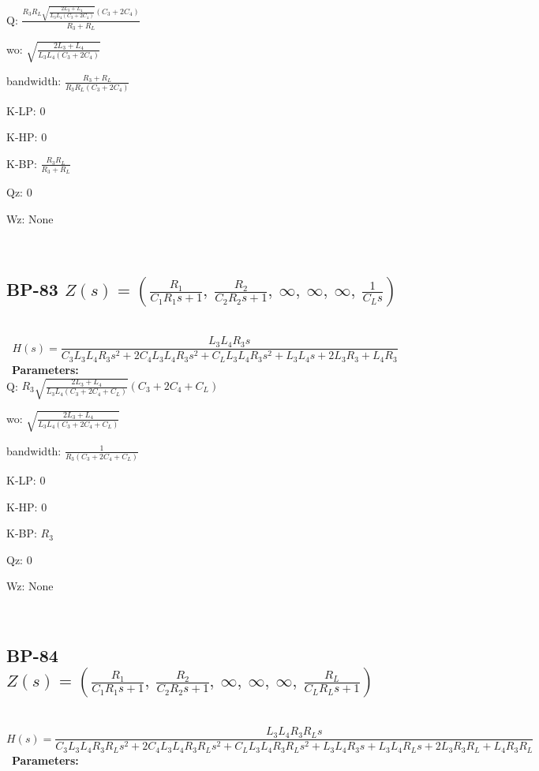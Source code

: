 \documentclass{article}
\begin{document}
Q: $\frac{R_{3} R_{L} \sqrt{\frac{2 L_{3} + L_{4}}{L_{3} L_{4} \left(C_{3} + 2 C_{4}\right)}} \left(C_{3} + 2 C_{4}\right)}{R_{3} + R_{L}}$\ 

wo: $\sqrt{\frac{2 L_{3} + L_{4}}{L_{3} L_{4} \left(C_{3} + 2 C_{4}\right)}}$\ 

bandwidth: $\frac{R_{3} + R_{L}}{R_{3} R_{L} \left(C_{3} + 2 C_{4}\right)}$\ 

K-LP: $0$\ 

K-HP: $0$\ 

K-BP: $\frac{R_{3} R_{L}}{R_{3} + R_{L}}$\ 

Qz: $0$\ 

Wz: $\text{None}$\ 

\ 

\subsection{BP-83 $Z(s) = \left( \frac{R_{1}}{C_{1} R_{1} s + 1}, \  \frac{R_{2}}{C_{2} R_{2} s + 1}, \  \infty, \  \infty, \  \infty, \  \frac{1}{C_{L} s}\right)$ } \ 
\textbf{\[H(s) = \frac{L_{3} L_{4} R_{3} s}{C_{3} L_{3} L_{4} R_{3} s^{2} + 2 C_{4} L_{3} L_{4} R_{3} s^{2} + C_{L} L_{3} L_{4} R_{3} s^{2} + L_{3} L_{4} s + 2 L_{3} R_{3} + L_{4} R_{3}}\] } \ 
\textbf{Parameters:}\\ 

Q: $R_{3} \sqrt{\frac{2 L_{3} + L_{4}}{L_{3} L_{4} \left(C_{3} + 2 C_{4} + C_{L}\right)}} \left(C_{3} + 2 C_{4} + C_{L}\right)$\ 

wo: $\sqrt{\frac{2 L_{3} + L_{4}}{L_{3} L_{4} \left(C_{3} + 2 C_{4} + C_{L}\right)}}$\ 

bandwidth: $\frac{1}{R_{3} \left(C_{3} + 2 C_{4} + C_{L}\right)}$\ 

K-LP: $0$\ 

K-HP: $0$\ 

K-BP: $R_{3}$\ 

Qz: $0$\ 

Wz: $\text{None}$\ 

\ 

\subsection{BP-84 $Z(s) = \left( \frac{R_{1}}{C_{1} R_{1} s + 1}, \  \frac{R_{2}}{C_{2} R_{2} s + 1}, \  \infty, \  \infty, \  \infty, \  \frac{R_{L}}{C_{L} R_{L} s + 1}\right)$ } \ 
\textbf{\[H(s) = \frac{L_{3} L_{4} R_{3} R_{L} s}{C_{3} L_{3} L_{4} R_{3} R_{L} s^{2} + 2 C_{4} L_{3} L_{4} R_{3} R_{L} s^{2} + C_{L} L_{3} L_{4} R_{3} R_{L} s^{2} + L_{3} L_{4} R_{3} s + L_{3} L_{4} R_{L} s + 2 L_{3} R_{3} R_{L} + L_{4} R_{3} R_{L}}\] } \ 
\textbf{Parameters:}\\ 
\end{document}
